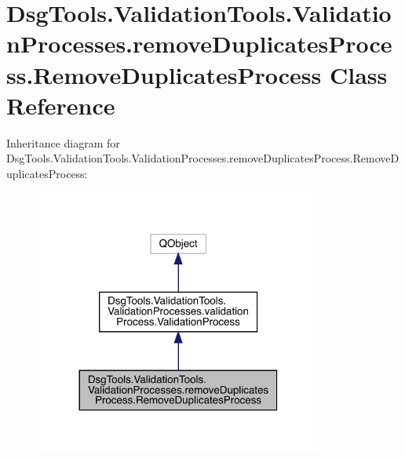 \hypertarget{class_dsg_tools_1_1_validation_tools_1_1_validation_processes_1_1remove_duplicates_process_1_1_remove_duplicates_process}{}\section{Dsg\+Tools.\+Validation\+Tools.\+Validation\+Processes.\+remove\+Duplicates\+Process.\+Remove\+Duplicates\+Process Class Reference}
\label{class_dsg_tools_1_1_validation_tools_1_1_validation_processes_1_1remove_duplicates_process_1_1_remove_duplicates_process}


Inheritance diagram for Dsg\+Tools.\+Validation\+Tools.\+Validation\+Processes.\+remove\+Duplicates\+Process.\+Remove\+Duplicates\+Process\+:
\nopagebreak
\begin{figure}[H]
\begin{center}
\leavevmode
\includegraphics[width=269pt]{class_dsg_tools_1_1_validation_tools_1_1_validation_processes_1_1remove_duplicates_process_1_1_r4ab7753f048f7a29229061789e89401c}
\end{center}
\end{figure}


